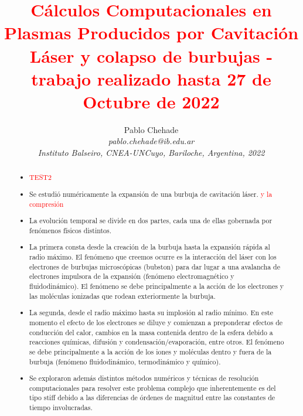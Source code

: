 \documentclass[aps,prb,onecolumn,superscriptaddress,floatfix,longbibliography,10pt]{revtex4-2}
\newcounter{para}
\begin{document}
\newcommand{\mytitle}{\textcolor{red}{Cálculos Computacionales en Plasmas Producidos por Cavitación Láser y colapso de burbujas - trabajo realizado hasta 27 de Octubre de 2022}}

\title{\mytitle}

\author{Pablo Chehade \\
    \small \textit{pablo.chehade@ib.edu.ar} \\
    \small \textit{Instituto Balseiro, CNEA-UNCuyo, Bariloche, Argentina, 2022} \\}


\begin{abstract}
  \begin{itemize}
    \item \textcolor{red}{TEST2}
    \item Se estudió numéricamente la expansión de una burbuja de cavitación láser. \textcolor{red}{y la compresión}
    \item La evolución temporal se divide en dos partes, cada una de ellas gobernada por fenómenos físicos distintos.
    \item La primera consta desde la creación de la burbuja hasta la expansión rápida al radio máximo. El fenómeno que creemos ocurre es la interacción del láser con los electrones de burbujas microscópicas (bubston) para dar lugar a una avalancha de electrones impulsora de la expansión (fenómeno electromagnético y fluidodinámico). El fenómeno se debe principalmente a la acción de los electrones y las moléculas ionizadas que rodean exteriormente la burbuja.
    \item La segunda, desde el radio máximo hasta su implosión al radio mínimo. En este momento el efecto de los electrones se diluye y comienzan a preponderar efectos de conducción del calor, cambios en la masa contenida dentro de la esfera debido a reacciones químicas, difusión y condensación/evaporación, entre otros. El fenómeno se debe principalmente a la acción de los iones y moléculas dentro y fuera de la burbuja (fenómeno fluidodinámico, termodinámico y químico).
    \item Se exploraron además distintos métodos numéricos y técnicas de resolución computacionales para resolver este problema complejo que inherentemente es del tipo stiff debido a las diferencias de órdenes de magnitud entre las constantes de tiempo involucradas.
  \end{itemize}


\end{abstract}
\end{document}
